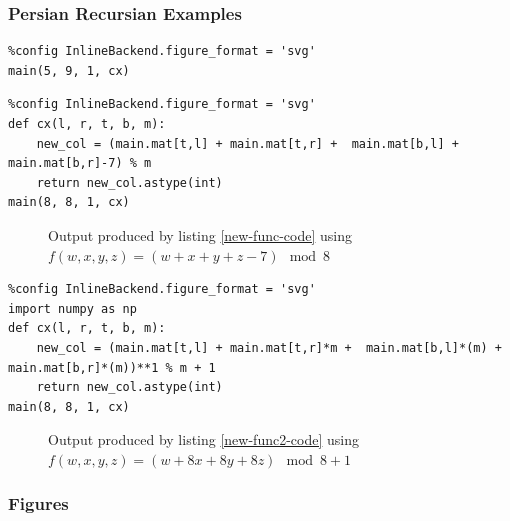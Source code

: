 \documentclass[11pt]{article}
\begin{document}
\subsubsection{Persian Recursian Examples}
\label{persian-recursion-examples}
\begin{lstlisting}
%config InlineBackend.figure_format = 'svg'
main(5, 9, 1, cx)
\end{lstlisting}
\begin{center}

\end{center}


\begin{lstlisting}
%config InlineBackend.figure_format = 'svg'
def cx(l, r, t, b, m):
    new_col = (main.mat[t,l] + main.mat[t,r] +  main.mat[b,l] + main.mat[b,r]-7) % m
    return new_col.astype(int)
main(8, 8, 1, cx)
\end{lstlisting}

\begin{figure}[htbp]
\centering

\caption{\label{new-func-plot}Output produced by listing \ref{new-func-code} using \(f(w,x,y,z) = (w + x + y + z - 7) \mod 8\)}
\end{figure}


\begin{lstlisting}
%config InlineBackend.figure_format = 'svg'
import numpy as np
def cx(l, r, t, b, m):
    new_col = (main.mat[t,l] + main.mat[t,r]*m +  main.mat[b,l]*(m) + main.mat[b,r]*(m))**1 % m + 1
    return new_col.astype(int)
main(8, 8, 1, cx)
\end{lstlisting}


\begin{figure}[htbp]
\centering

\caption{\label{new-func2-plot}Output produced by listing \ref{new-func2-code} using \(f(w,x,y,z) = (w + 8x + 8y + 8z) \mod 8 + 1\)}
\end{figure}
\subsubsection{Figures}
\label{sec:orgc6975e1}
\end{document}
